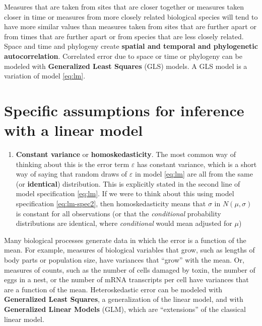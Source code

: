 \documentclass[]{book}
\providecommand{\tightlist}{%
  \setlength{\itemsep}{0pt}\setlength{\parskip}{0pt}}
\begin{document}
Measures that are taken from sites that are closer together or measures
taken closer in time or measures from more closely related biological
species will tend to have more similar values than measures taken from
sites that are further apart or from times that are further apart or
from species that are less closely related. Space and time and phylogeny
create \textbf{spatial and temporal and phylogenetic autocorrelation}.
Correlated error due to space or time or phylogeny can be modeled with
\textbf{Generalized Least Squares} (GLS) models. A GLS model is a
variation of model \eqref{eq:lm}.

\section{Specific assumptions for inference with a linear
model}\label{specific-assumptions-for-inference-with-a-linear-model}

\begin{enumerate}
\def\labelenumi{\arabic{enumi}.}
\tightlist
\item
  \textbf{Constant variance} or \textbf{homoskedasticity}. The most
  common way of thinking about this is the error term \(\varepsilon\)
  has constant variance, which is a short way of saying that random
  draws of \(\varepsilon\) in model \eqref{eq:lm} are all from the same
  (or \textbf{identical}) distribution. This is explicitly stated in the
  second line of model specification \eqref{eq:lm}. If we were to think
  about this using model specification \eqref{eq:lm-spec2}, then
  homoskedasticity means that \(\sigma\) in \(N(\mu, \sigma)\) is
  constant for all observations (or that the \emph{conditional}
  probability distributions are identical, where \emph{conditional}
  would mean adjusted for \(\mu\))
\end{enumerate}

Many biological processes generate data in which the error is a function
of the mean. For example, measures of biological variables that grow,
such as lengths of body parts or population size, have variances that
``grow'' with the mean. Or, measures of counts, such as the number of
cells damaged by toxin, the number of eggs in a nest, or the number of
mRNA transcripts per cell have variances that are a function of the
mean. Heteroskedastic error can be modeled with \textbf{Generalized
Least Squares}, a generalization of the linear model, and with
\textbf{Generalized Linear Models} (GLM), which are ``extensions'' of
the classical linear model.
\end{document}
